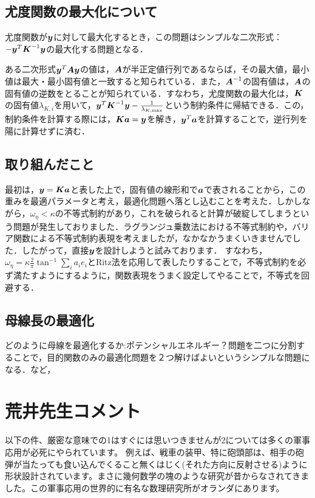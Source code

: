 \documentclass[11pt]{jsarticle}
\begin{document}
		\subsection{尤度関数の最大化について}
			尤度関数が$ \boldsymbol{y} $に対して最大化するとき，この問題はシンプルな二次形式：$ -\boldsymbol{y}^T \boldsymbol{K}^{-1} \boldsymbol{y} $の最大化する問題となる．
			
			ある二次形式$ \boldsymbol{y}^T \boldsymbol{A} \boldsymbol{y}$の値は，$ \boldsymbol{A} $が半正定値行列であるならば，その最大値，最小値は最大・最小固有値と一致すると知られている．また，$ \boldsymbol{A}^{-1} $の固有値は，$ \boldsymbol{A} $の固有値の逆数をとることが知られている．すなわち，尤度関数の最大化は，$ \boldsymbol{K} $の固有値$ \lambda_{K,i} $を用いて，$ \boldsymbol{y}^T \boldsymbol{K}^{-1} \boldsymbol{y} - \frac{1}{\lambda_{K,\max}} $という制約条件に帰結できる．この，制約条件を計算する際には，$ \boldsymbol{K} \boldsymbol{a} = \boldsymbol{y} $を解き，$ \boldsymbol{y}^T \boldsymbol{a} $を計算することで，逆行列を陽に計算せずに済む．
			
		\subsection{取り組んだこと}
			最初は，$ \boldsymbol{y} = \boldsymbol{K} \boldsymbol{a}$と表した上で，固有値の線形和で$ \boldsymbol{a} $で表されることから，この重みを最適パラメータと考え，最適化問題へ落とし込むことを考えた．しかしながら，$ \omega_{\eta} <\kappa$の不等式制約があり，これを破られると計算が破綻してしまうという問題が発生しておりました．ラグランジュ乗数法における不等式制約や，バリア関数による不等式制約表現を考えましたが，なかなかうまくいきませんでした．したがって，直接$ \boldsymbol{y} $を設計しようと試みております．
			すなわち，$\omega_{\eta} = \kappa \frac{2}{\pi} \tan^{-1} \sum_i a_i e_i $とRitz法を応用して表したりすることで，不等式制約を必ず満たすようにするように，関数表現をうまく設定してやることで，不等式を回避する．
		\subsection{母線長の最適化}
			どのように母線を最適化するか:ポテンシャルエネルギー？問題を二つに分割することで，目的関数のみの最適化問題を２つ解けばよいというシンプルな問題になる．など，
	\section{荒井先生コメント}
		以下の件、厳密な意味での1はすぐには思いつきませんが2については多くの軍事応用が必死にやられています。
		例えば、戦車の装甲、特に砲頭部は、相手の砲弾が当たっても食い込んでくること無くはじく(それた方向に反射させる)ように形状設計されています。まさに幾何数学の塊のような研究が昔からなされてきました。この軍事応用の世界的に有名な数理研究所がオランダにあります。
		
\end{document}
